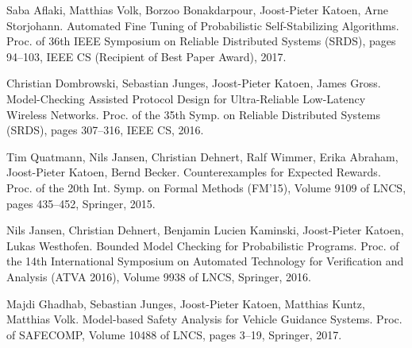 \documentclass[11pt]{article}
\begin{document}
\begin{thebibliography}{99}
	 Saba Aflaki, Matthias Volk, Borzoo Bonakdarpour, Joost-Pieter Katoen, Arne Storjohann. Automated Fine Tuning of Probabilistic Self-Stabilizing Algorithms. Proc. of 36th IEEE Symposium on Reliable Distributed Systems (SRDS), pages 94–103, IEEE CS (Recipient of Best Paper Award), 2017.	
		
	 Christian Dombrowski, Sebastian Junges, Joost-Pieter Katoen, James Gross. Model-Checking Assisted Protocol Design for Ultra-Reliable Low-Latency Wireless Networks. Proc. of the 35th Symp. on Reliable Distributed Systems (SRDS), pages 307–316, IEEE CS, 2016.
	
	 Tim Quatmann, Nils Jansen, Christian Dehnert, Ralf Wimmer, Erika Abraham, Joost-Pieter Katoen, Bernd Becker. Counterexamples for Expected Rewards. Proc. of the 20th Int. Symp. on Formal Methods (FM'15), Volume 9109 of LNCS, pages 435–452, Springer, 2015.
	
	 Nils Jansen, Christian Dehnert, Benjamin Lucien Kaminski, Joost-Pieter Katoen, Lukas Westhofen. Bounded Model Checking for Probabilistic Programs. Proc. of the 14th International Symposium on Automated Technology for Verification and Analysis (ATVA 2016), Volume 9938 of LNCS, Springer, 2016.
	
	 Majdi Ghadhab, Sebastian Junges, Joost-Pieter Katoen, Matthias Kuntz, Matthias Volk. Model-based Safety Analysis for Vehicle Guidance Systems. Proc. of SAFECOMP, Volume 10488 of LNCS, pages 3–19, Springer, 2017.
\end{thebibliography}
\end{document}
